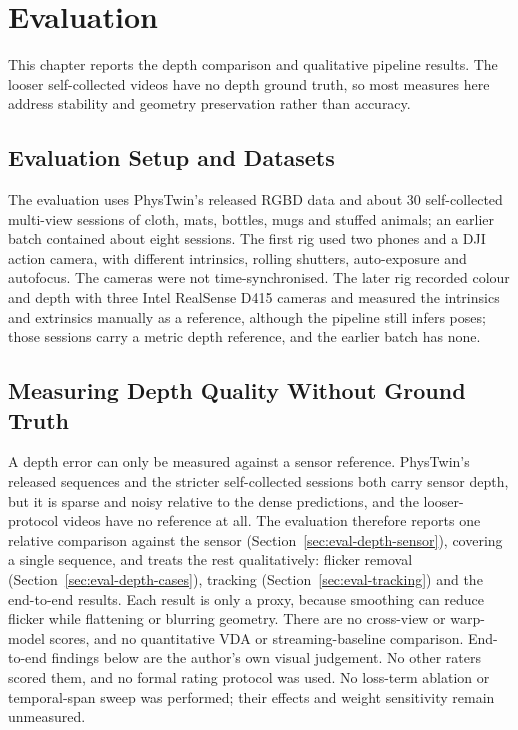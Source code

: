 \chapter{Evaluation}
\label{cha:evaluation}

This chapter reports the depth comparison and qualitative pipeline results. The looser
self-collected videos have no depth ground truth, so most measures here address stability and
geometry preservation rather than accuracy.

\section{Evaluation Setup and Datasets}
\label{sec:eval-setup}

The evaluation uses PhysTwin's released RGBD data \parencite{phystwin} and about 30 self-collected
multi-view sessions of cloth, mats, bottles, mugs and stuffed animals; an earlier batch contained
about eight sessions. The first rig used two phones and a DJI action camera, with different
intrinsics, rolling shutters, auto-exposure and autofocus. The cameras were not time-synchronised.
The later rig recorded colour and depth with three Intel RealSense D415 cameras and measured the
intrinsics and extrinsics manually as a reference, although the pipeline still infers poses; those sessions carry a metric depth reference, and the earlier
batch has none.


\section{Measuring Depth Quality Without Ground Truth}
\label{sec:eval-protocol}

A depth error can only be measured against a sensor reference. PhysTwin's released sequences and
the stricter self-collected sessions both carry sensor depth, but it is sparse and noisy relative to
the dense predictions, and the looser-protocol videos have no reference at all. The evaluation
therefore reports one relative comparison against the sensor
(Section~\ref{sec:eval-depth-sensor}), covering a single sequence, and treats the rest
qualitatively: flicker removal (Section~\ref{sec:eval-depth-cases}), tracking
(Section~\ref{sec:eval-tracking}) and the end-to-end results. Each result is only a proxy, because
smoothing can reduce flicker while flattening or blurring geometry. There are no cross-view or
warp-model scores, and no quantitative VDA or streaming-baseline comparison. End-to-end findings
below are the author's own visual judgement. No other raters scored them, and no formal rating protocol was used. No loss-term ablation
or temporal-span sweep was performed; their effects and weight sensitivity remain
unmeasured.\label{sec:eval-ablations}


